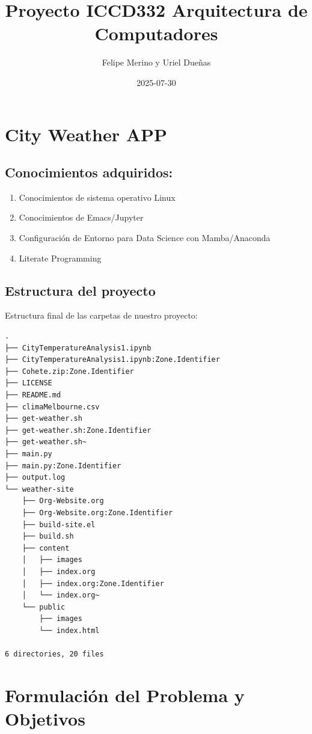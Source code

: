 \documentclass[11pt]{article}
\author{Felipe Merino y Uriel Dueñas}
\date{2025-07-30}
\title{Proyecto ICCD332 Arquitectura de Computadores}
\begin{document}
\maketitle
\tableofcontents

\section{City Weather APP}
\label{sec:org50d0b09}
\subsection{Conocimientos adquiridos:}
\label{sec:orgd7e9484}

\begin{enumerate}
\item Conocimientos de sistema operativo Linux
\item Conocimientos de Emacs/Jupyter
\item Configuración de Entorno para Data Science con Mamba/Anaconda
\item Literate Programming
\end{enumerate}

\subsection{Estructura del proyecto}
\label{sec:org8e10f9c}

Estructura final de las carpetas de nuestro proyecto:

\begin{verbatim}
.
├── CityTemperatureAnalysis1.ipynb
├── CityTemperatureAnalysis1.ipynb:Zone.Identifier
├── Cohete.zip:Zone.Identifier
├── LICENSE
├── README.md
├── climaMelbourne.csv
├── get-weather.sh
├── get-weather.sh:Zone.Identifier
├── get-weather.sh~
├── main.py
├── main.py:Zone.Identifier
├── output.log
└── weather-site
    ├── Org-Website.org
    ├── Org-Website.org:Zone.Identifier
    ├── build-site.el
    ├── build.sh
    ├── content
    │   ├── images
    │   ├── index.org
    │   ├── index.org:Zone.Identifier
    │   └── index.org~
    └── public
        ├── images
        └── index.html

6 directories, 20 files
\end{verbatim}

\section{Formulación del Problema y Objetivos}
\label{sec:orgac53fc9}
\end{document}
